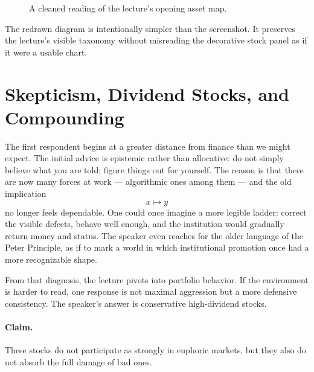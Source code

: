 \begin{figure}[htbp]
\centering
{}
\caption{A cleaned reading of the lecture's opening asset map.}
\end{figure}

The redrawn diagram is intentionally simpler than the screenshot. It preserves the lecture's visible taxonomy without misreading the decorative stock panel as if it were a usable chart.

\section{Skepticism, Dividend Stocks, and Compounding}

The first respondent begins at a greater distance from finance than we might expect. The initial advice is epistemic rather than allocative: do not simply believe what you are told; figure things out for yourself. The reason is that there are now many forces at work --- algorithmic ones among them --- and the old implication
\[
x \longmapsto y
\]
no longer feels dependable. One could once imagine a more legible ladder: correct the visible defects, behave well enough, and the institution would gradually return money and status. The speaker even reaches for the older language of the Peter Principle, as if to mark a world in which institutional promotion once had a more recognizable shape.

From that diagnosis, the lecture pivots into portfolio behavior. If the environment is harder to read, one response is not maximal aggression but a more defensive consistency. The speaker's answer is conservative high-dividend stocks.

\paragraph{Claim.}
These stocks do not participate as strongly in euphoric markets, but they also do not absorb the full damage of bad ones.


